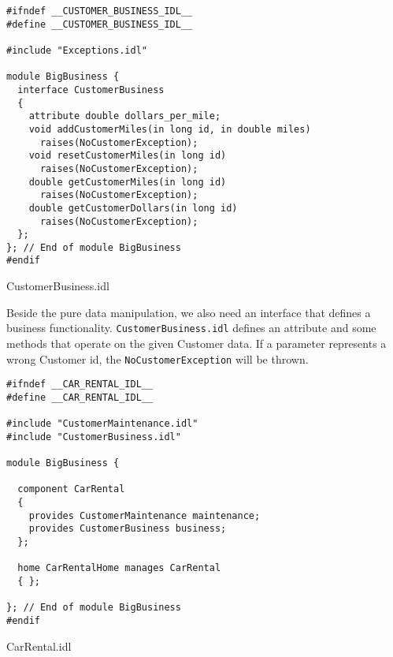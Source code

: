 \newpage

\begin{Example}
\begin{minifbox}
\begin{small}
\begin{verbatim}
#ifndef __CUSTOMER_BUSINESS_IDL__
#define __CUSTOMER_BUSINESS_IDL__

#include "Exceptions.idl"

module BigBusiness {
  interface CustomerBusiness
  {
    attribute double dollars_per_mile;
    void addCustomerMiles(in long id, in double miles) 
      raises(NoCustomerException);
    void resetCustomerMiles(in long id) 
      raises(NoCustomerException);
    double getCustomerMiles(in long id) 
      raises(NoCustomerException);
    double getCustomerDollars(in long id) 
      raises(NoCustomerException);
  };
}; // End of module BigBusiness
#endif
\end{verbatim}
\end{small}
\end{minifbox}
\caption{CustomerBusiness.idl}
\label{example:}
\end{Example}

Beside the pure data manipulation, we also need an interface that defines a
business functionality.
{\tt CustomerBusiness.idl} defines an attribute and some methods that operate
on the given Customer data. 
If a parameter represents a wrong Customer id, the {\tt NoCustomerException}
will be thrown.

\begin{Example}
\begin{minifbox}
\begin{small}
\begin{verbatim}
#ifndef __CAR_RENTAL_IDL__
#define __CAR_RENTAL_IDL__

#include "CustomerMaintenance.idl"
#include "CustomerBusiness.idl"

module BigBusiness {

  component CarRental 
  { 
    provides CustomerMaintenance maintenance;
    provides CustomerBusiness business;
  };
  
  home CarRentalHome manages CarRental 
  { };

}; // End of module BigBusiness
#endif
\end{verbatim}
\end{small}
\end{minifbox}
\caption{CarRental.idl}
\label{example:}
\end{Example}

